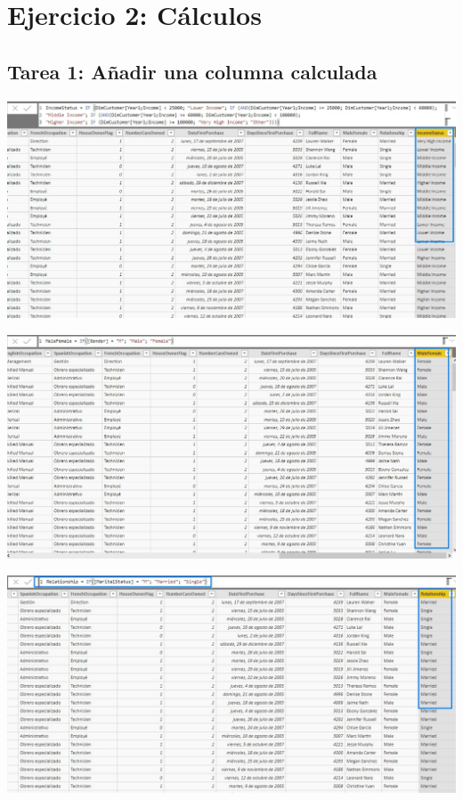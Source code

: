 \section{Ejercicio 2: Cálculos}
\subsection{Tarea 1: Añadir una columna calculada}

\begin{center}
\includegraphics[width=\columnwidth]{images/task3/task3-02}\newline
\end{center}

\begin{center}
\includegraphics[width=\columnwidth]{images/task3/task3-05}\newline
\end{center}

\begin{center}
\includegraphics[width=\columnwidth]{images/task3/task3-06}\newline
\end{center}

